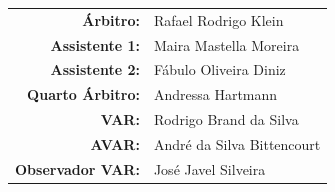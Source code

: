 \documentclass[11pt]{article}
\newcommand{\teamjersey}{}
\begin{document}
\vspace{0.5cm}
\begin{minipage}{0.65\textwidth}
\begin{center}
\begin{tabular}{rl}
\textbf{Árbitro:} & Rafael Rodrigo Klein \\
\textbf{Assistente 1:} & Maira Mastella Moreira \\
\textbf{Assistente 2:} & Fábulo Oliveira Diniz \\
\textbf{Quarto Árbitro:} & Andressa Hartmann \\
\textbf{VAR:} & Rodrigo Brand da Silva \\
\textbf{AVAR:} & André da Silva Bittencourt \\
\textbf{Observador VAR:} & José Javel Silveira \\
\end{tabular}
\end{center}
\end{minipage}
\begin{minipage}{0.3\textwidth}
\end{minipage}
\newpage
\vspace{0.5cm}
\renewcommand{\teamjersey}{../assets/camisa/costas1.png}
\end{document}
